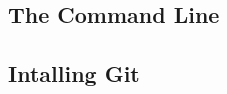 \subsection{The Command Line}
\begin{frame}[t]{}
\end{frame}

\subsection{Intalling Git}
\begin{frame}[t]{}
\end{frame}

\begin{frame}[t]{}
\end{frame}

\begin{frame}[t]{}
\end{frame}

\begin{frame}[t]{}
\end{frame}

\begin{frame}[t]{}
\end{frame}

\begin{frame}[t]{}
\end{frame}

\begin{frame}[t]{}
\end{frame}

